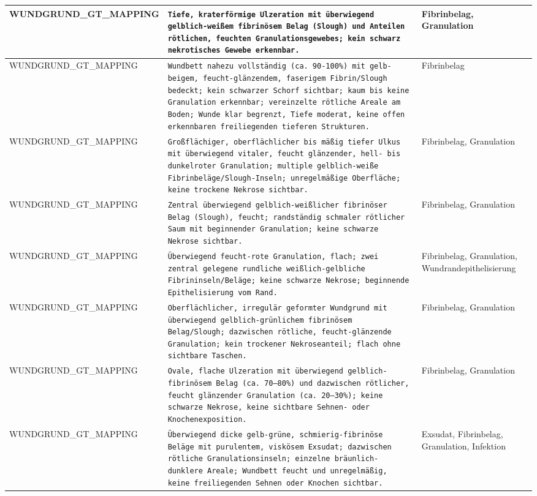 \begin{longtable}{|p{3.5cm}|p{5cm}|p{6.5cm}|}
WUNDGRUND\_GT\_MAPPING & \texttt{Tiefe, kraterförmige Ulzeration mit überwiegend gelblich-weißem fibrinösem Belag (Slough) und Anteilen rötlichen, feuchten Granulationsgewebes; kein schwarz nekrotisches Gewebe erkennbar.} & Fibrinbelag, Granulation \\ \hline
WUNDGRUND\_GT\_MAPPING & \texttt{Wundbett nahezu vollständig (ca. 90-100\%) mit gelb-beigem, feucht-glänzendem, faserigem Fibrin/Slough bedeckt; kein schwarzer Schorf sichtbar; kaum bis keine Granulation erkennbar; vereinzelte rötliche Areale am Boden; Wunde klar begrenzt, Tiefe moderat, keine offen erkennbaren freiliegenden tieferen Strukturen.} & Fibrinbelag \\ \hline
WUNDGRUND\_GT\_MAPPING & \texttt{Großflächiger, oberflächlicher bis mäßig tiefer Ulkus mit überwiegend vitaler, feucht glänzender, hell- bis dunkelroter Granulation; multiple gelblich‑weiße Fibrinbeläge/Slough-Inseln; unregelmäßige Oberfläche; keine trockene Nekrose sichtbar.} & Fibrinbelag, Granulation \\ \hline
WUNDGRUND\_GT\_MAPPING & \texttt{Zentral überwiegend gelblich-weißlicher fibrinöser Belag (Slough), feucht; randständig schmaler rötlicher Saum mit beginnender Granulation; keine schwarze Nekrose sichtbar.} & Fibrinbelag, Granulation \\ \hline
WUNDGRUND\_GT\_MAPPING & \texttt{Überwiegend feucht-rote Granulation, flach; zwei zentral gelegene rundliche weißlich-gelbliche Fibrininseln/Beläge; keine schwarze Nekrose; beginnende Epithelisierung vom Rand.} & Fibrinbelag, Granulation, Wundrandepithelisierung \\ \hline
WUNDGRUND\_GT\_MAPPING & \texttt{Oberflächlicher, irregulär geformter Wundgrund mit überwiegend gelblich-grünlichem fibrinösem Belag/Slough; dazwischen rötliche, feucht-glänzende Granulation; kein trockener Nekroseanteil; flach ohne sichtbare Taschen.} & Fibrinbelag, Granulation \\ \hline
WUNDGRUND\_GT\_MAPPING & \texttt{Ovale, flache Ulzeration mit überwiegend gelblich-fibrinösem Belag (ca. 70–80\%) und dazwischen rötlicher, feucht glänzender Granulation (ca. 20–30\%); keine schwarze Nekrose, keine sichtbare Sehnen- oder Knochenexposition.} & Fibrinbelag, Granulation \\ \hline
WUNDGRUND\_GT\_MAPPING & \texttt{Überwiegend dicke gelb-grüne, schmierig-fibrinöse Beläge mit purulentem, viskösem Exsudat; dazwischen rötliche Granulationsinseln; einzelne bräunlich-dunklere Areale; Wundbett feucht und unregelmäßig, keine freiliegenden Sehnen oder Knochen sichtbar.} & Exsudat, Fibrinbelag, Granulation, Infektion \\ \hline

\end{longtable}
